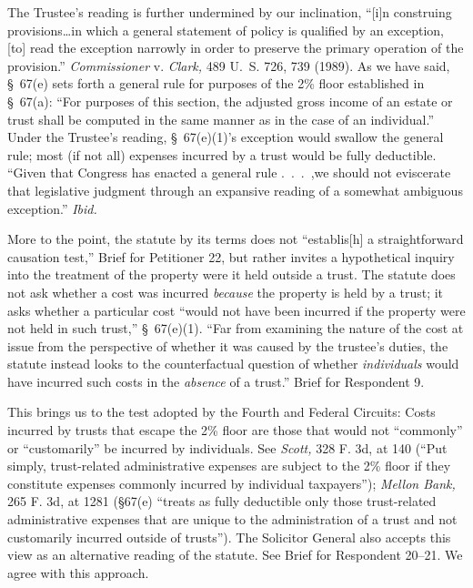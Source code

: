 {  The Trustee's reading is further undermined by our inclination, ``[i]n construing provisions\dots in which a general statement of policy is qualified by an exception, [to] read the exception narrowly in order to preserve the primary operation of the provision.'' \emph{Commissioner} v. \emph{Clark,} 489 U.~S. 726, 739 (1989). As we have said, \S~67(e) sets forth a general \newpage  rule for purposes of the 2\% floor established in \S~67(a): ``For purposes of this section, the adjusted gross income of an estate or trust shall be computed in the same manner as in the case of an individual.'' Under the Trustee's reading, \S~67(e)(1)'s exception would swallow the general rule; most (if not all) expenses incurred by a trust would be fully deductible. ``Given that Congress has enacted a general rule .~.~.~,we should not eviscerate that legislative judgment through an expansive reading of a somewhat ambiguous exception.'' \emph{Ibid.}

  More to the point, the statute by its terms does not ``establis[h] a straightforward causation test,'' Brief for Petitioner 22, but rather invites a hypothetical inquiry into the treatment of the property were it held outside a trust. The statute does not ask whether a cost was incurred \emph{because} the property is held by a trust; it asks whether a particular cost ``would not have been incurred if the property were not held in such trust,'' \S~67(e)(1). ``Far from examining the nature of the cost at issue from the perspective of whether it was caused by the trustee's duties, the statute instead looks to the counterfactual question of whether \emph{individuals} would have incurred such costs in the \emph{absence} of a trust.'' Brief for Respondent 9.

  This brings us to the test adopted by the Fourth and Federal Circuits: Costs incurred by trusts that escape the 2\% floor are those that would not ``commonly'' or ``customarily'' be incurred by individuals. See \emph{Scott,} 328 F. 3d, at 140 (``Put simply, trust-related administrative expenses are subject to the 2\% floor if they constitute expenses commonly incurred by individual taxpayers''); \emph{Mellon Bank,} 265 F. 3d, at 1281 (\S67(e) ``treats as fully deductible only those trust-related administrative expenses that are unique to the administration of a trust and not customarily incurred outside of trusts''). The Solicitor General also accepts this view as an alternative reading of the statute. See Brief for Respondent 20--21. We agree with this approach.\starpage 

}

